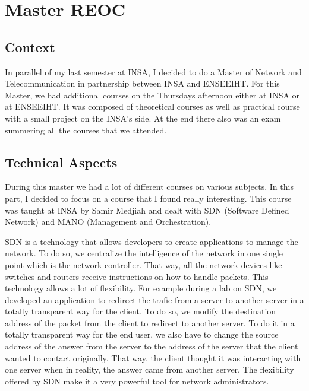 \section{Master REOC}

\subsection{Context}

In parallel of my last semester at INSA, I decided to do a Master of Network and Telecommunication in partnership between INSA and ENSEEIHT. For this Master, we had additional courses on the Thursdays afternoon either at INSA or at ENSEEIHT. It was composed of theoretical courses as well as practical course with a small project on the INSA's side. At the end there also was an exam summering all the courses that we attended. 

\subsection{Technical Aspects}

During this master we had a lot of different courses on various subjects. In this part, I decided to focus on a course that I found really interesting. This course was taught at INSA by Samir Medjiah and dealt with SDN (Software Defined Network) and MANO (Management and Orchestration). 
\\\par
SDN is a technology that allows developers to create applications to manage the network. To do so, we centralize the intelligence of the network in one single point which is the network controller. That way, all the network devices like switches and routers receive instructions on how to handle packets. This technology allows a lot of flexibility. For example during a lab on SDN, we developed an application to redirect the trafic from a server to another server in a totally transparent way for the client. To do so, we modify the destination address of the packet from the client to redirect to another server. To do it in a totally transparent way for the end user, we also have to change the source address of the answer from the server to the address of the server that the client wanted to contact originally. That way, the client thought it was interacting with one server when in reality, the answer came from another server. The flexibility offered by SDN make it a very powerful tool for network administrators.
\\\par

